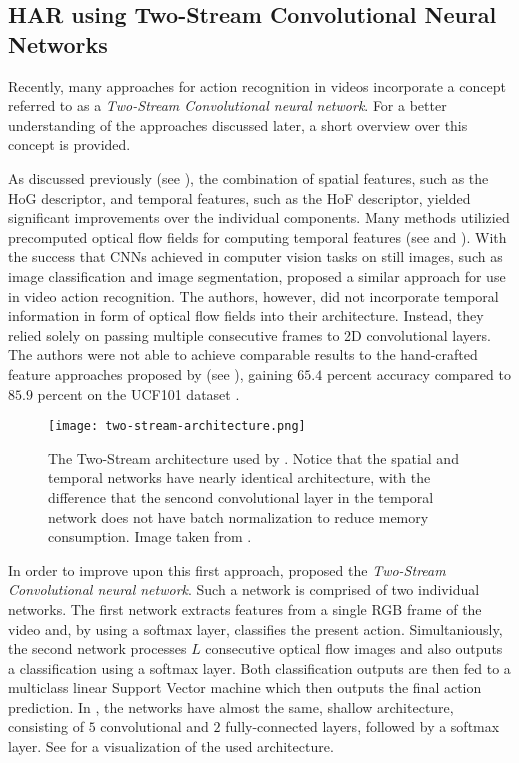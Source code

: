 \subsection{HAR using Two-Stream Convolutional Neural Networks}
\label{sec:two-stream}
Recently, many approaches for action recognition in videos incorporate a concept referred to as a \textit{Two-Stream Convolutional neural network}.
For a better understanding of the approaches discussed later, a short overview over this concept is provided.

As discussed previously (see ), the combination of spatial features, such as the HoG descriptor, and temporal features, such as the HoF descriptor, yielded significant improvements over the individual components.
Many methods utilizied precomputed optical flow fields for computing temporal features (see  and ).
With the success that CNNs achieved in computer vision tasks on still images, such as image classification and image segmentation, \cite{karpathy_large-scale_2014} proposed a similar approach for use in video action recognition.
The authors, however, did not incorporate temporal information in form of optical flow fields into their architecture.
Instead, they relied solely on passing multiple consecutive frames to 2D convolutional layers.
The authors were not able to achieve comparable results to the hand-crafted feature approaches proposed by \cite{wang_action_2013} (see ), gaining $65.4$ percent accuracy compared to $85.9$ percent on the UCF101 dataset \cite{soomro_ucf101:_2012}.

\begin{figure}[htb!]
    \centering
    \texttt{[image: two-stream-architecture.png]}
    \caption{The Two-Stream architecture used by \cite{simonyan_two-stream_2014}. Notice that the spatial and temporal networks have nearly identical architecture, with the difference that the sencond convolutional layer in the temporal network does not have batch normalization to reduce memory consumption. Image taken from \cite{simonyan_two-stream_2014}. }
    \label{fig:two-stream-architecture}
\end{figure}

In order to improve upon this first approach, \cite{simonyan_two-stream_2014} proposed the \textit{Two-Stream Convolutional neural network}.
Such a network is comprised of two individual networks.
The first network extracts features from a single RGB frame of the video and, by using a softmax layer, classifies the present action.
Simultaniously, the second network processes $L$ consecutive optical flow images and also outputs a classification using a softmax layer.
Both classification outputs are then fed to a multiclass linear Support Vector machine which then outputs the final action prediction.
In \cite{simonyan_two-stream_2014}, the networks have almost the same, shallow architecture, consisting of $5$ convolutional and $2$ fully-connected layers, followed by a softmax layer.
See  for a visualization of the used architecture.

